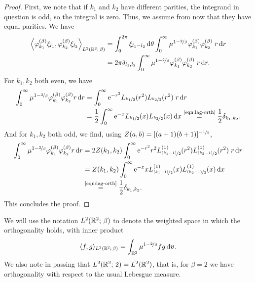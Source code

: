 \begin{proof}
First, we note that if $k_1$ and $k_2$ have different parities, the integrand in question is odd, so the
integral is zero. Thus, we assume from now that they have equal parities. We have
\begin{align*}
    \left\langle \varphi^{(\beta)}_{k_1}\xi_{l_1}, \varphi^{(\beta)}_{k_2}\xi_{l_2} 
    \right\rangle_{L^2(\mathbb{R}^2;\,\beta)} 
    &= \int_0^{2\pi} \xi_{l_1-l_2} \,\mathrm{d}\theta \int_0^\infty \mu^{1-\nicefrac{2}{\beta}}
       \varphi_{k_1}^{(\beta)} \varphi_{k_2}^{(\beta)}\; r \,\mathrm{d} r \\
    &= 2\pi\delta_{l_1,l_2} \int_0^\infty \mu^{1-\nicefrac{2}{\beta}}
       \varphi_{k_1}^{(\beta)} \varphi_{k_2}^{(\beta)} \;r \,\mathrm{d} r. \\
\end{align*}
For $k_1, k_2$ both even, we have
\begin{align*}
    \int_0^\infty \mu^{1-\nicefrac{2}{\beta}} \varphi_{k_1}^{(\beta)} \varphi_{k_2}^{(\beta)} r \,\mathrm{d} r
    &= \int_0^\infty \mathrm{e}^{-r^2} L_{\nicefrac{k_1}{2}}(r^2) L_{\nicefrac{k_2}{2}}(r^2)\; r \,\mathrm{d} r \\
    &= \frac{1}{2} \int_0^\infty \mathrm{e}^{-x} L_{\nicefrac{k_1}{2}}(x) L_{\nicefrac{k_2}{2}}(x) \,\mathrm{d} x
    \overset{\text{\eqref{eqn:lag-orth}}}{=} \frac{1}{2} \delta_{k_1,k_2}.
\end{align*}
And for $k_1, k_2$ both odd, we find, using $Z(a,b)=[(a+1)(b+1)]^{-\nicefrac{1}{2}}$,
\begin{align*}
    \int_0^\infty \mu^{1-\nicefrac{2}{\beta}} \varphi_{k_1}^{(\beta)} \varphi_{k_2}^{(\beta)} r \,\mathrm{d} r
    &= 2Z(k_1,k_2) \int_0^\infty
       \mathrm{e}^{-r^2} r^2 L^{(1)}_{\nicefrac{(k_1-1)}{2}}(r^2) L^{(1)}_{\nicefrac{(k_2-1)}{2}}(r^2)\; r \,\mathrm{d} r \\
    &= Z(k_1,k_2) \int_0^\infty 
       \mathrm{e}^{-x} x L^{(1)}_{\nicefrac{(k_1-1)}{2}}(x) L^{(1)}_{\nicefrac{(k_2-1)}{2}}(x) \,\mathrm{d} x \\
    & \overset{\text{\eqref{eqn:lag-orth}}}{=} \frac{1}{2} \delta_{k_1,k_2}.
\end{align*}
This concludes the proof.
\end{proof}
We will use the notation $L^2(\mathbb{R}^2;\,\beta)$ to denote the weighted space in which the orthogonality holds,
with inner product
\[
    \langle f,g \rangle_{L^2(\mathbb{R}^2;\,\beta)} = \int_{\mathbb{R}^2} \mu^{1-\nicefrac{2}{\beta}} f g \,\mathrm{d}{\bm v}.
\]
We also note in passing that $L^2(\mathbb{R}^2;\,2)=L^2(\mathbb{R}^2)$, that is, for $\beta=2$ we have orthogonality with
respect to the usual Lebesgue measure.

